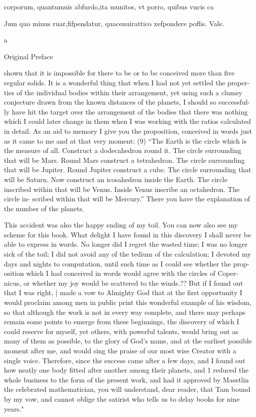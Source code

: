 \documentclass{article}
\begin{document}
{{{{{{{{{{{{{{corporum, quantumuis abfurdo,ita munitos, vt porro, quibus vncis ca

Jum quo minus ruar,fifpendatur, quacenuirattico
xefpondere poflis. Vale.

a



Original Preface

shown that it is impossible for there to be or to be conceived more than five
regular solids. It is a wonderful thing that when I had not yet settled the proper-
ties of the individual bodies within their arrangement, yet using such a clumsy
conjecture drawn from the known distances of the planets, I should so successful-
ly have hit the target over the arrangement of the bodies that there was nothing
which I could later change in them when I was working with the ratios calculated
in detail. As an aid to memory I give you the proposition, conceived in words just
as it came to me and at that very moment: (9) “The Earth is the circle which is the
measure of all. Construct a dodecahedron round it. The circle surrounding that
will be Mars. Round Mars construct a tetrahedron. The circle surrounding that
will be Jupiter. Round Jupiter construct a cube. The circle surrounding that will
be Saturn. Now construct an icosahedron inside the Earth. The circle inscribed
within that will be Venus. Inside Venus inscribe an octahedron. The circle in-
scribed within that will be Mercury.” There you have the explanation of the
number of the planets.

This accident was also the happy ending of my toil. You can now also see my
scheme for this book. What delight I have found in this discovery I shall never be
able to express in words. No longer did I regret the wasted time; I was no longer
sick of the toil; I did not avoid any of the tedium of the calculation; I devoted my
days and nights to computation, until such time as I could see whether the prop-
osition which I had conceived in words would agree with the circles of Coper-
nicus, or whether my joy would be scattered to the winds.?? But if I found out
that I was right, | made a vow to Almighty God that at the first opportunity I
would proclaim among men in public print this wonderful example of his
wisdom, so that although the work is not in every way complete, and there may
perhaps remain some points to emerge from these beginnings, the discovery of
which I could reserve for myself, yet others, with powerful talents, would bring
out as many of them as possible, to the glory of God’s name, and at the earliest
possible moment after me, and would sing the praise of our most wise Creator
with a single voice. Therefore, since the success came after a few days, and I
found out how neatly one body fitted after another among their planets, and 1
reduced the whole business to the form of the present work, and had it approved
by Maestlin the celebrated mathematician, you will understand, dear reader, that
Tam bound by my vow, and cannot oblige the satirist who tells us to delay books
for nine years."

}}}}}}}}}}}}}}
\end{document}
